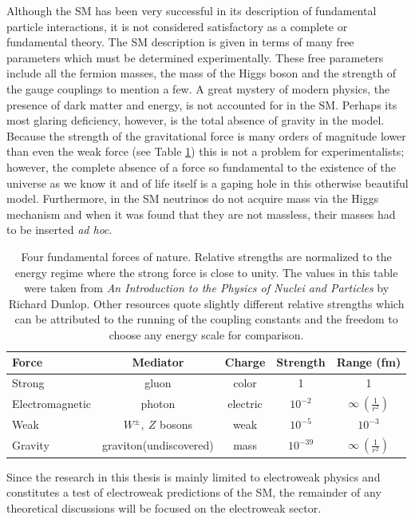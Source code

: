 Although the SM has been very successful in its description of fundamental particle interactions, it is not considered satisfactory as a complete or fundamental theory. The SM description is given in terms of many free parameters which must be determined experimentally. These free parameters include all the fermion masses, the mass of the Higgs boson and the strength of the gauge couplings to mention a few. A great mystery of modern physics, the presence of dark matter and energy, is not accounted for in the SM. Perhaps its most glaring deficiency, however, is the total absence of gravity in the model. Because the strength of the gravitational force is many orders of magnitude lower than even the weak force (see Table \ref{tab:fundamental_forces}) this is not a problem for experimentalists; however, the complete absence of a force so fundamental to the existence of the universe as we know it and of life itself is a gaping hole in this otherwise beautiful model. Furthermore, in the SM neutrinos do not acquire mass via the Higgs mechanism and when it was found that they are not massless, their masses had to be inserted {\it ad hoc}.
\begin{table}[h]
\caption{Four fundamental forces of nature. Relative strengths are normalized to the energy regime where the strong force is close to unity. The values in this table were taken from {\it An Introduction to the Physics of Nuclei and Particles} by Richard Dunlop. Other resources quote slightly different relative strengths which can be attributed to the running of the coupling constants and the freedom to choose any energy scale for comparison.}
\begin{center}
\begin{tabular}{l|c|c|c|c}\hline
Force & Mediator & Charge & Strength & Range (fm)\\ \hline
Strong & gluon & color & 1 & 1\\
Electromagnetic & photon & electric & $10^{-2}$ & $\infty~(\frac{1}{r^2})$\\
Weak & $W^{\pm},~Z$ bosons & weak & $10^{-5}$ & $10^{-3}$\\
Gravity & graviton(undiscovered) & mass & $10^{-39}$ & $\infty~(\frac{1}{r^2})$\\
\hline
\end{tabular}
\end{center}
\label{tab:fundamental_forces}
\end{table}

Since the research in this thesis is mainly limited to electroweak physics and constitutes a test of electroweak predictions of the SM, the remainder of any theoretical discussions will be focused on the electroweak sector. 

